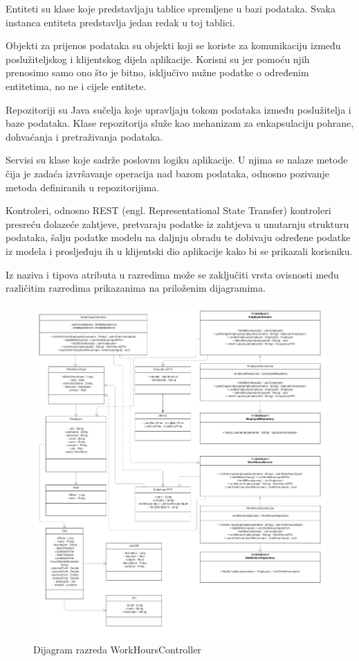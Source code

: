             Entiteti su klase koje predstavljaju tablice spremljene u bazi podataka. Svaka instanca entiteta predstavlja jedan redak u toj tablici.  

            Objekti za prijenos podataka su objekti koji se koriste za komunikaciju između poslužiteljskog i klijentskog dijela aplikacije. Korisni su jer pomoću njih prenosimo samo ono što je bitno, isključivo nužne podatke o određenim entitetima, no ne i cijele entitete. 
            
            Repozitoriji su Java sučelja koje upravljaju tokom podataka između poslužitelja i baze podataka. Klase repozitorija služe kao mehanizam za enkapsulaciju pohrane, dohvaćanja i pretraživanja podataka.  
            
            Servisi su klase koje sadrže poslovnu logiku aplikacije. U njima se nalaze metode čija je zadaća izvršavanje operacija nad bazom podataka, odnosno pozivanje metoda definiranih u repozitorijima. 
            
            Kontroleri, odnosno REST (engl. Representational State Transfer) kontroleri presreću dolazeće zahtjeve, pretvaraju podatke iz zahtjeva u unutarnju strukturu podataka, šalju podatke modelu na daljnju obradu te dobivaju određene podatke iz modela i prosljeđuju ih u klijentski dio aplikacije kako bi se prikazali korisniku.  
            
            Iz naziva i tipova atributa u razredima može se zaključiti vrsta ovisnosti među različitim razredima prikazanima na priloženim dijagramima. 
			
			\begin{figure}[H]
					\centering
					\includegraphics[width=\textwidth]{slike/Dijagram razreda - WorkHoursController.jpg}
					\caption{Dijagram razreda WorkHoursController}
				\end{figure}
			
